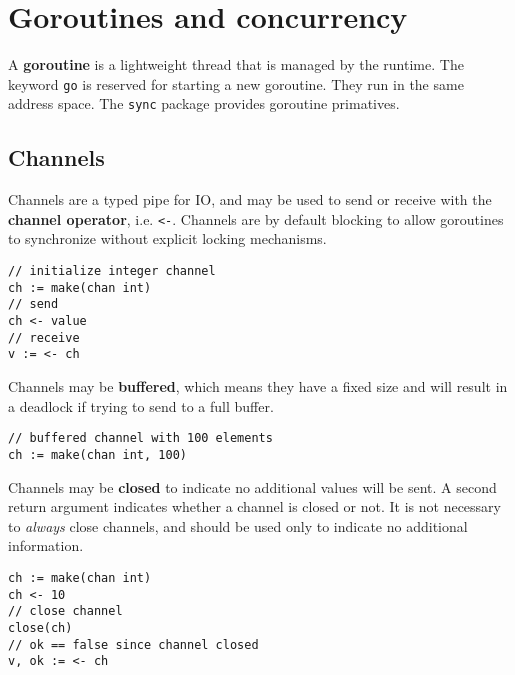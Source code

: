 \documentclass{article}
\begin{document}
\section{Goroutines and concurrency}

\noindent A \textbf{goroutine} is a lightweight thread that is managed by the runtime. The keyword \lstinline|go| is reserved for starting a new goroutine. They run in the same address space. The \lstinline|sync| package provides goroutine primatives.

\subsection{Channels}

\begin{paracol}{2}
Channels are a typed pipe for IO, and may be used to send or receive with the \textbf{channel operator}, i.e. \lstinline|<-|. Channels are by default blocking to allow goroutines to synchronize without explicit locking mechanisms.

\switchcolumn

\begin{lstlisting}
// initialize integer channel
ch := make(chan int)
// send 
ch <- value
// receive
v := <- ch
\end{lstlisting}

\switchcolumn*

\noindent Channels may be \textbf{buffered}, which means they have a fixed size and will result in a deadlock if trying to send to a full buffer.
\\

\switchcolumn
\begin{lstlisting}
// buffered channel with 100 elements
ch := make(chan int, 100)
\end{lstlisting}

\switchcolumn*

\noindent Channels may be \textbf{closed} to indicate no additional values will be sent. A second return argument indicates whether a channel is closed or not. It is not necessary to \textit{always} close channels, and should be used only to indicate no additional information.


\switchcolumn

\begin{lstlisting}
ch := make(chan int)
ch <- 10
// close channel
close(ch)
// ok == false since channel closed
v, ok := <- ch
\end{lstlisting}
\switchcolumn*


\end{paracol}
\end{document}
